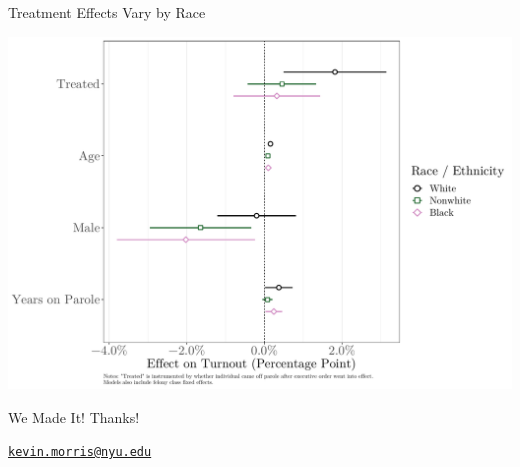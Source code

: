 \documentclass[
  ignorenonframetext,
]{beamer}
\begin{document}
\begin{frame}{Treatment Effects Vary by Race}
\protect\hypertarget{treatment-effects-vary-by-race}{}
\begin{center}\includegraphics[width=0.85\linewidth,height=0.85\textheight]{mpsa_files/figure-beamer/unnamed-chunk-4-1} \end{center}
\end{frame}

\begin{frame}{We Made It!}
\protect\hypertarget{we-made-it}{}
Thanks!

\href{mailto:kevin.morris@nyu.edu}{\nolinkurl{kevin.morris@nyu.edu}}
\end{frame}
\end{document}
